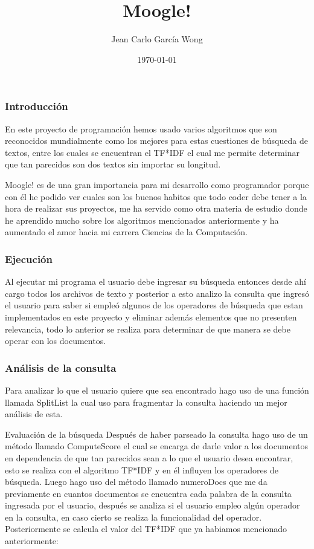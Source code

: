 \documentclass{beamer}
\title{Moogle!}
\author{Jean Carlo García Wong}
\date{\today}
\begin{document}
\begin{frame}
  \titlepage
\end{frame}

\begin{frame}
  \frametitle{Introducción}
    En este proyecto de programación hemos usado varios algoritmos
    que son reconocidos mundialmente como los mejores para estas 
    cuestiones de búsqueda de textos, entre los cuales se encuentran
    el TF*IDF el cual me permite determinar que tan parecidos son dos textos sin importar su longitud.

    Moogle! es de una gran importancia para mi desarrollo como programador
    porque con él he podido ver cuales son los buenos habitos que todo coder
    debe tener a la hora de realizar sus proyectos, me ha servido como otra
    materia de estudio donde he aprendido mucho sobre los algoritmos mencionados
    anteriormente y ha aumentado el amor hacia mi carrera Ciencias de la Computación.
  \end{frame}

\begin{frame}
  \frametitle{Ejecución}
    Al ejecutar mi programa el usuario debe ingresar su búsqueda entonces desde
    ahí cargo todos los archivos de texto y posterior a esto analizo la consulta
    que ingresó el usuario para saber si empleó algunos de los operadores de búsqueda
    que estan implementados en este proyecto y eliminar además elementos que no presenten
    relevancia, todo lo anterior se realiza para determinar de que manera se debe operar
    con los documentos.
\end{frame}

\begin{frame}
  \frametitle{Análisis de la consulta}
  Para analizar lo que el usuario quiere que sea encontrado hago uso de una función 
  llamada SplitList la cual uso para fragmentar la consulta haciendo un mejor análisis
  de esta.
\end{frame}

\begin{frame}{Evaluación de la búsqueda}
    Después de haber parseado la consulta hago uso de un método llamado ComputeScore el cual
    se encarga de darle valor a los documentos en dependencia de que tan parecidos sean a lo que
    el usuario desea encontrar, esto se realiza con el algoritmo TF*IDF y en él influyen los 
    operadores de búsqueda. Luego hago uso del método llamado numeroDocs que me da
    previamente en cuantos documentos se encuentra cada palabra de la consulta ingresada por el usuario,
    después se analiza si el usuario empleo algún operador en la consulta, en caso cierto se realiza 
    la funcionalidad del operador. Posteriormente se calcula el valor del TF*IDF que ya habiamos mencionado
    anteriormente:
\end{frame}
\end{document}
